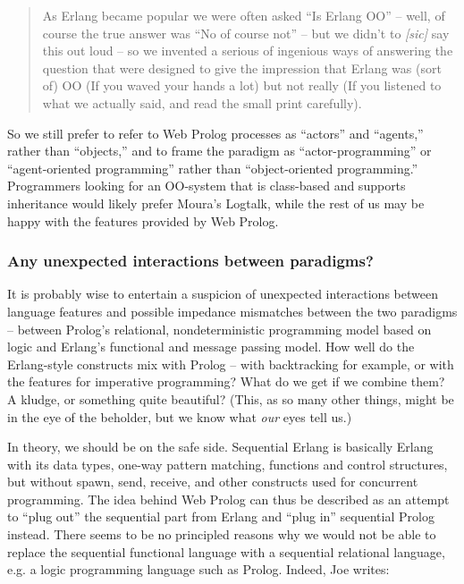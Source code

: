 \begin{quotation}
As Erlang became popular we were often asked ``Is Erlang OO'' -- well, of course the true answer was ``No of course not'' -- but we didn't to \emph{[sic]} say this out loud -- so we invented a serious of ingenious ways of answering the question that were designed to give the impression that Erlang was (sort of) OO (If you waved your hands a lot) but not really (If you listened to what we actually said, and read the small print carefully).
\end{quotation}

\noindent So we still prefer to refer to Web Prolog processes as ``actors'' and ``agents,'' rather than ``objects,'' and to frame the paradigm as ``actor-programming'' or ``agent-oriented programming'' rather than ``object-oriented programming.'' Programmers looking for an OO-system that is class-based and supports inheritance would likely prefer Moura's Logtalk, while the rest of us may be happy with the features provided by Web Prolog.

\subsubsection{Any unexpected interactions between paradigms?}

It is probably wise to entertain a suspicion of unexpected interactions between language features and possible impedance mismatches between the two paradigms -- between Prolog's relational, nondeterministic programming model based on logic and Erlang's functional and message passing model. How well do the Erlang-style constructs mix with Prolog -- with backtracking for example, or with the features for imperative programming? What do we get if we combine them? A kludge, or something quite beautiful? (This, as so many other things, might be in the eye of the beholder, but we know what \textit{our} eyes tell us.)

In theory, we should be on the safe side. Sequential Erlang is basically Erlang with its data types, one-way pattern matching, functions and control structures, but without spawn, send, receive, and other constructs used for concurrent programming. The idea behind Web Prolog can thus be described as an attempt to ``plug out'' the sequential part from Erlang and ``plug in'' sequential Prolog instead. There seems to be no principled reasons why we would not be able to replace the sequential functional language with a sequential relational language, e.g. a logic programming language such as Prolog. Indeed, Joe \citet{armstrong2003concurrency} writes:

